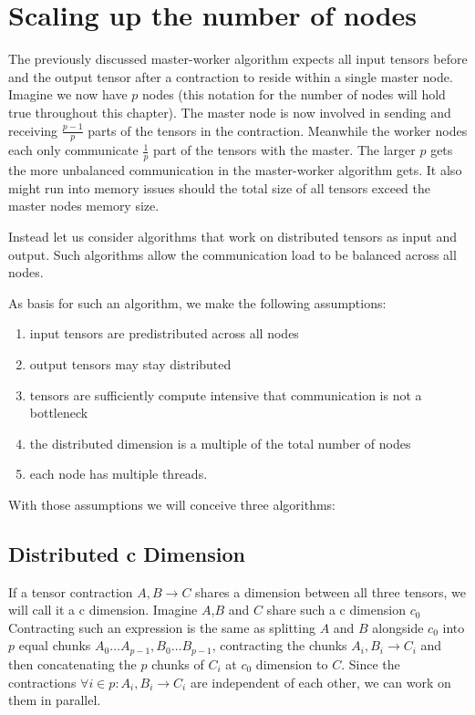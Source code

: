 \section{Scaling up the number of nodes}

The previously discussed master-worker algorithm expects all input tensors before and the output tensor after a contraction to reside within a single master node.
Imagine we now have $p$ nodes (this notation for the number of nodes will hold true throughout this chapter).
The master node is now involved in sending and receiving $\frac{p-1}{p}$ parts of the tensors in the contraction.
Meanwhile the worker nodes each only communicate $\frac{1}{p}$ part of the tensors with the master.
The larger $p$ gets the more unbalanced communication in the master-worker algorithm gets.
It also might run into memory issues should the total size of all tensors exceed the master nodes memory size.

Instead let us consider algorithms that work on distributed tensors as input and output.
Such algorithms allow the communication load to be balanced across all nodes.

As basis for such an algorithm, we make the following assumptions:
\begin{enumerate}
    \item input tensors are predistributed across all nodes
    \item output tensors may stay distributed
    \item tensors are sufficiently compute intensive that communication is not a bottleneck
    \item the distributed dimension is a multiple of the total number of nodes
    \item each node has multiple threads.
\end{enumerate}


With those assumptions we will conceive three algorithms:

\subsection{Distributed c Dimension}

If a tensor contraction $A,B \rightarrow C$ shares a dimension between all three tensors, we will call it a c dimension.
Imagine $A$,$B$ and $C$ share such a c dimension $c_0$
Contracting such an expression is the same as splitting $A$ and $B$ alongside $c_0$ into $p$ equal chunks $A_0\dots A_{p-1}, B_0\dots B_{p-1}$, contracting the chunks $A_i, B_i \rightarrow C_i$ and then concatenating the $p$ chunks of $C_i$ at $c_0$ dimension to $C$.
Since the contractions $\forall i \in p: A_i, B_i \rightarrow C_i$ are independent of each other, we can work on them in parallel.


